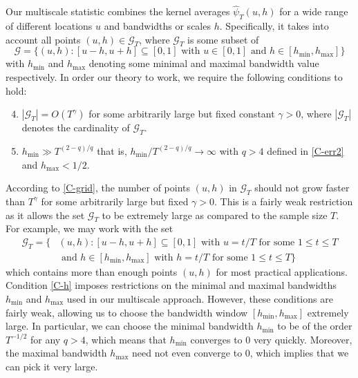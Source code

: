 \documentclass[a4paper,12pt]{article}
\numberwithin{equation}{section}
\begin{document}
Our multiscale statistic combines the kernel averages $\widehat{\psi}_T(u,h)$ for a wide range of different locations $u$ and bandwidths or scales $h$. Specifically, it takes into account all points $(u,h) \in \mathcal{G}_T$, where $\mathcal{G}_T$ is some subset of 
\begin{equation}\label{g-set}
\mathcal{G} =  \big\{ (u,h): [u-h,u+h] \subseteq [0,1] \text{ with } u \in [0,1] \text{ and } h \in [h_{\min},h_{\max}] \big\} 
\end{equation}
with $h_{\min}$ and $h_{\max}$ denoting some minimal and maximal bandwidth value respectively. In order our theory to work, we require the following conditions to hold:
\begin{enumerate}[label=(C\arabic*),leftmargin=1.05cm]
\setcounter{enumi}{3}

\item \label{C-grid} $|\mathcal{G}_T| = O(T^\gamma)$ for some arbitrarily large but fixed constant $\gamma > 0$, where $|\mathcal{G}_T|$ denotes the cardinality of $\mathcal{G}_T$. 

\item \label{C-h} $h_{\min} \gg T^{(2-q)/q}$  that is, $h_{\min} / T^{(2-q)/q} \rightarrow \infty$ with $q > 4$ defined in \ref{C-err2} and $h_{\max}< 1/2$.

\end{enumerate}
According to \ref{C-grid}, the number of points $(u,h)$ in $\mathcal{G}_T$ should not grow faster than $T^\gamma$ for some arbitrarily large but fixed $\gamma > 0$. This is a fairly weak restriction as it allows the set $\mathcal{G}_T$ to be extremely large as compared to the sample size $T$. For example, we may work with the set 
\begin{align*}
\mathcal{G}_T = \big\{ & (u,h): [u-h,u+h] \subseteq [0,1] \text{ with } u = t/T \text{ for some } 1 \le t \le T \\ & \text{ and } h \in [h_{\min},h_{\max}] \text{ with } h = t/T \text{ for some } 1 \le t \le T  \big\}
\end{align*}
which contains more than enough points $(u,h)$ for most practical applications. Condition \ref{C-h} imposes restrictions on the minimal and maximal bandwidths $h_{\min}$ and $h_{\max}$ used in our multiscale approach. However, these conditions are fairly weak, allowing us to choose the bandwidth window $[h_{\min},h_{\max}]$ extremely large. In particular, we can choose the minimal bandwidth $h_{\min}$ to be of the order $T^{-1/2}$ for any $q > 4$, which means that $h_{\min}$ converges to $0$ very quickly. Moreover, the maximal bandwidth $h_{\max}$ need not even converge to $0$, which implies that we can pick it very large.
\end{document}
